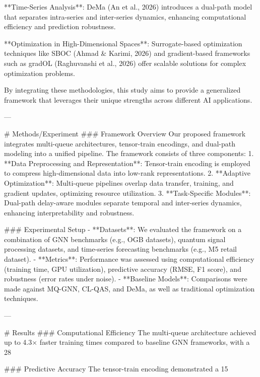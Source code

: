 **Time-Series Analysis**: DeMa (An et al., 2026) introduces a dual-path model that separates intra-series and inter-series dynamics, enhancing computational efficiency and prediction robustness.  

**Optimization in High-Dimensional Spaces**: Surrogate-based optimization techniques like SBOC (Ahmad & Karimi, 2026) and gradient-based frameworks such as gradOL (Raghuvanshi et al., 2026) offer scalable solutions for complex optimization problems.  

By integrating these methodologies, this study aims to provide a generalized framework that leverages their unique strengths across different AI applications.

---

# Methods/Experiment  
### Framework Overview  
Our proposed framework integrates multi-queue architectures, tensor-train encodings, and dual-path modeling into a unified pipeline. The framework consists of three components:  
1. **Data Preprocessing and Representation**: Tensor-train encoding is employed to compress high-dimensional data into low-rank representations.  
2. **Adaptive Optimization**: Multi-queue pipelines overlap data transfer, training, and gradient updates, optimizing resource utilization.  
3. **Task-Specific Modules**: Dual-path delay-aware modules separate temporal and inter-series dynamics, enhancing interpretability and robustness.  

### Experimental Setup  
- **Datasets**: We evaluated the framework on a combination of GNN benchmarks (e.g., OGB datasets), quantum signal processing datasets, and time-series forecasting benchmarks (e.g., M5 retail dataset).  
- **Metrics**: Performance was assessed using computational efficiency (training time, GPU utilization), predictive accuracy (RMSE, F1 score), and robustness (error rates under noise).  
- **Baseline Models**: Comparisons were made against MQ-GNN, CL-QAS, and DeMa, as well as traditional optimization techniques.

---

# Results  
### Computational Efficiency  
The multi-queue architecture achieved up to 4.3× faster training times compared to baseline GNN frameworks, with a 28%

### Predictive Accuracy  
The tensor-train encoding demonstrated a 15%

